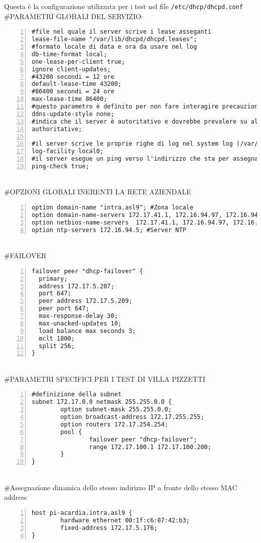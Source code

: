 Questa è la configurazione utilizzata per i test nel file \verb|/etc/dhcp/dhcpd.conf| \\
\#PARAMETRI GLOBALI DEL SERVIZIO:
\begin{lstlisting}[numbers=left, breaklines=true]
#file nel quale il server scrive i lease asseganti
lease-file-name "/var/lib/dhcpd/dhcpd.leases";
#formato locale di data e ora da usare nel log
db-time-format local;
one-lease-per-client true;
ignore client-updates;
#43200 secondi = 12 ore
default-lease-time 43200;
#86400 secondi = 24 ore
max-lease-time 86400;
#questo parametro è definito per non fare interagire precauzionalmente il DHCP server con il DNS
ddns-update-style none;
#indica che il server è autoritativo e dovrebbe prevalere su altri eventuali server DHCP che operino sulla stessa rete
authoritative;

#il server scrive le proprie righe di log nel system log (/var/log/messages)
log-facility local0;
#il server esegue un ping verso l'indirizzo che sta per assegnare dinamicamente, se ottiene risposta, non lo assegna
ping-check true;
\end{lstlisting}
\\
\#OPZIONI GLOBALI INERENTI LA RETE AZIENDALE
\begin{lstlisting}[numbers=left, breaklines=true]
option domain-name "intra.asl9"; #Zona locale
option domain-name-servers 172.17.41.1, 172.16.94.97, 172.16.94.98; #Server DNS
option netbios-name-servers  172.17.41.1, 172.16.94.97, 172.16.94.98; #Sever WINS
option ntp-servers 172.16.94.5; #Server NTP
\end{lstlisting}
\\
\#FAILOVER
\begin{lstlisting}[numbers=left, breaklines=true]
failover peer "dhcp-failover" {
  primary;
  address 172.17.5.207;
  port 647;
  peer address 172.17.5.209;
  peer port 647;
  max-response-delay 30;
  max-unacked-updates 10;
  load balance max seconds 3;
  mclt 1800;
  split 256;
}
\end{lstlisting}
\\
\#PARAMETRI SPECIFICI PER I TEST DI VILLA PIZZETTI
\begin{lstlisting}[numbers=left, breaklines=true]
#definizione della subnet
subnet 172.17.0.0 netmask 255.255.0.0 {
        option subnet-mask 255.255.0.0;
        option broadcast-address 172.17.255.255;
        option routers 172.17.254.254;
        pool {
                failover peer "dhcp-failover";
                range 172.17.100.1 172.17.100.200;
        }
}
\end{lstlisting}
\\
\#Assegnazione dinamica dello stesso indirizzo IP a fronte dello stesso MAC address 
\begin{lstlisting}[numbers=left, breaklines=true]
host pi-acardia.intra.asl9 {
        hardware ethernet 00:1f:c6:87:42:b3;
        fixed-address 172.17.5.176;
}
\end{lstlisting}


